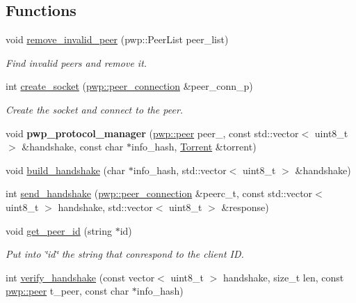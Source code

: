 \subsection*{Functions}
\begin{DoxyCompactItemize}
\item 
void \hyperlink{namespacepwp_ae8331eb5e3c98deddc6022dad92352f6}{remove\+\_\+invalid\+\_\+peer} (pwp\+::\+Peer\+List peer\+\_\+list)
\begin{DoxyCompactList}\small\item\em Find invalid peers and remove it. \end{DoxyCompactList}\item 
int \hyperlink{namespacepwp_a73acf05b954e39825a88036d5793db6b}{create\+\_\+socket} (\hyperlink{structpwp_1_1peer__connection}{pwp\+::peer\+\_\+connection} \&peer\+\_\+conn\+\_\+p)
\begin{DoxyCompactList}\small\item\em Create the socket and connect to the peer. \end{DoxyCompactList}\item 
\mbox{\label{namespacepwp_a62060bdcdc80541b0892e26fbeab1e91}} 
void {\bfseries pwp\+\_\+protocol\+\_\+manager} (\hyperlink{structpwp_1_1peer}{pwp\+::peer} peer\+\_\+, const std\+::vector$<$ uint8\+\_\+t $>$ \&handshake, const char $\ast$info\+\_\+hash, \hyperlink{structTorrent}{Torrent} \&torrent)
\item 
void \hyperlink{namespacepwp_a6062876f4d4d4d6ee19341a79a797864}{build\+\_\+handshake} (char $\ast$info\+\_\+hash, std\+::vector$<$ uint8\+\_\+t $>$ \&handshake)
\item 
int \hyperlink{namespacepwp_a851ddc0e8fb2eb0a86317cc944c4a927}{send\+\_\+handshake} (\hyperlink{structpwp_1_1peer__connection}{pwp\+::peer\+\_\+connection} \&peerc\+\_\+t, const std\+::vector$<$ uint8\+\_\+t $>$ handshake, std\+::vector$<$ uint8\+\_\+t $>$ \&response)
\item 
void \hyperlink{namespacepwp_ada6a8613896dbbfd6fba63b17d51684c}{get\+\_\+peer\+\_\+id} (string $\ast$id)
\begin{DoxyCompactList}\small\item\em Put into \char`\"{}id\char`\"{} the string that conrespond to the client ID. \end{DoxyCompactList}\item 
int \hyperlink{namespacepwp_a58c780495f2139a56b95662dc7c0345f}{verify\+\_\+handshake} (const vector$<$ uint8\+\_\+t $>$ handshake, size\+\_\+t len, const \hyperlink{structpwp_1_1peer}{pwp\+::peer} t\+\_\+peer, const char $\ast$info\+\_\+hash)

\end{DoxyCompactItemize}
